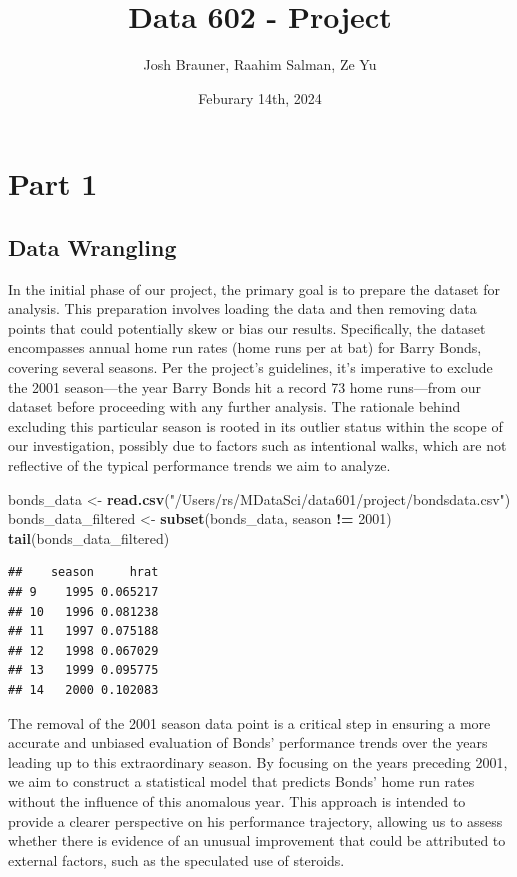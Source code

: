 \documentclass[
]{article}
\title{Data 602 - Project}
\author{Josh Brauner, Raahim Salman, Ze Yu}
\date{Feburary 14th, 2024}
\newenvironment{Shaded}{\begin{snugshade}}{\end{snugshade}}
\newcommand{\DecValTok}[1]{\textcolor[rgb]{0.00,0.00,0.81}{#1}}
\newcommand{\FunctionTok}[1]{\textcolor[rgb]{0.13,0.29,0.53}{\textbf{#1}}}
\newcommand{\NormalTok}[1]{#1}
\newcommand{\OtherTok}[1]{\textcolor[rgb]{0.56,0.35,0.01}{#1}}
\newcommand{\SpecialCharTok}[1]{\textcolor[rgb]{0.81,0.36,0.00}{\textbf{#1}}}
\newcommand{\StringTok}[1]{\textcolor[rgb]{0.31,0.60,0.02}{#1}}
\begin{document}
\maketitle

\section{Part 1}\label{part-1}

\subsection{Data Wrangling}\label{data-wrangling}

In the initial phase of our project, the primary goal is to prepare the
dataset for analysis. This preparation involves loading the data and
then removing data points that could potentially skew or bias our
results. Specifically, the dataset encompasses annual home run rates
(home runs per at bat) for Barry Bonds, covering several seasons. Per
the project's guidelines, it's imperative to exclude the 2001
season---the year Barry Bonds hit a record 73 home runs---from our
dataset before proceeding with any further analysis. The rationale
behind excluding this particular season is rooted in its outlier status
within the scope of our investigation, possibly due to factors such as
intentional walks, which are not reflective of the typical performance
trends we aim to analyze.

\begin{Shaded}
\begin{Highlighting}[]
\NormalTok{bonds\_data }\OtherTok{\textless{}{-}} \FunctionTok{read.csv}\NormalTok{(}\StringTok{"/Users/rs/MDataSci/data601/project/bondsdata.csv"}\NormalTok{)}
\NormalTok{bonds\_data\_filtered }\OtherTok{\textless{}{-}} \FunctionTok{subset}\NormalTok{(bonds\_data, season }\SpecialCharTok{!=} \DecValTok{2001}\NormalTok{)}
\FunctionTok{tail}\NormalTok{(bonds\_data\_filtered)}
\end{Highlighting}
\end{Shaded}

\begin{verbatim}
##    season     hrat
## 9    1995 0.065217
## 10   1996 0.081238
## 11   1997 0.075188
## 12   1998 0.067029
## 13   1999 0.095775
## 14   2000 0.102083
\end{verbatim}

The removal of the 2001 season data point is a critical step in ensuring
a more accurate and unbiased evaluation of Bonds' performance trends
over the years leading up to this extraordinary season. By focusing on
the years preceding 2001, we aim to construct a statistical model that
predicts Bonds' home run rates without the influence of this anomalous
year. This approach is intended to provide a clearer perspective on his
performance trajectory, allowing us to assess whether there is evidence
of an unusual improvement that could be attributed to external factors,
such as the speculated use of steroids.
\end{document}
